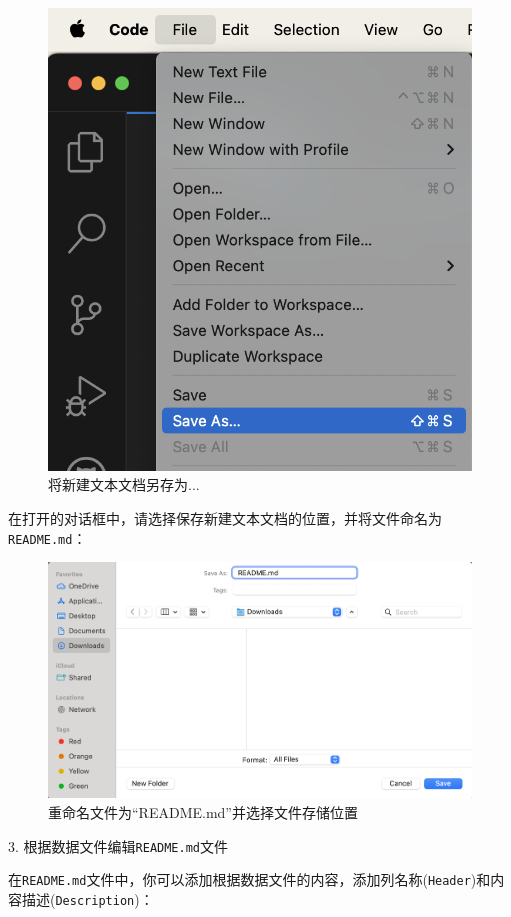 \documentclass[]{ctexbook}
\theoremstyle{definition}
\theoremstyle{definition}
\theoremstyle{definition}
\theoremstyle{definition}
\theoremstyle{remark}
\begin{document}
\begin{figure}

{\centering \includegraphics[width=0.7\linewidth]{img/vscode/mkreadme_saveas1} 

}

\caption{将新建文本文档另存为...}\label{fig:mkreadme-saveas1}
\end{figure}

在打开的对话框中，请选择保存新建文本文档的位置，并将文件命名为\texttt{README.md}：

\begin{figure}

{\centering \includegraphics[width=0.8\linewidth]{img/vscode/mkreadme_saveas2} 

}

\caption{重命名文件为“README.md”并选择文件存储位置}\label{fig:mkreadme-saveas2}
\end{figure}

3. 根据数据文件编辑\texttt{README.md}文件

在\texttt{README.md}文件中，你可以添加根据数据文件的内容，添加列名称(\texttt{Header})和内容描述(\texttt{Description})：
\end{document}
